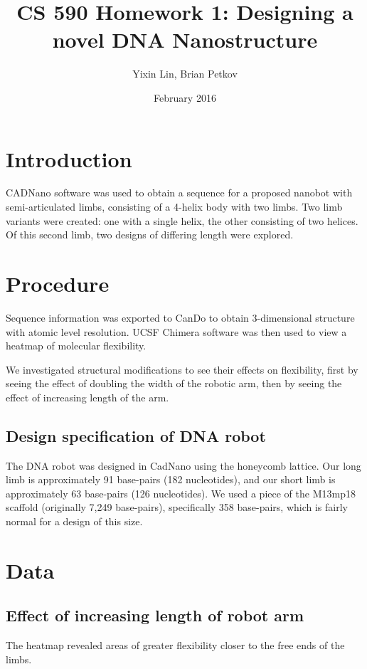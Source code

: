 \documentclass{article}
\title{CS 590 Homework 1: Designing a novel DNA Nanostructure}
\author{Yixin Lin, Brian Petkov }
\date{February 2016}
\begin{document}
\maketitle

\section{Introduction}

CADNano software was used to obtain a sequence for a proposed nanobot with semi-articulated limbs, consisting of a 4-helix body with two limbs. Two limb variants were created: one with a single helix, the other consisting of two helices. Of this second limb, two designs of differing length were explored.

\section{Procedure}

Sequence information was exported to CanDo to obtain 3-dimensional structure with atomic level resolution. UCSF Chimera software was then used to view a heatmap of molecular flexibility.

We investigated structural modifications to see their effects on flexibility, first by seeing the effect of doubling the width of the robotic arm, then by seeing the effect of increasing length of the arm.

\subsection{Design specification of DNA robot}

The DNA robot was designed in CadNano using the honeycomb lattice. Our long limb is approximately 91 base-pairs (182 nucleotides), and our short limb is approximately 63 base-pairs (126 nucleotides). We used a piece of the M13mp18 scaffold (originally 7,249 base-pairs), specifically 358 base-pairs, which is fairly normal for a design of this size.


\section{Data}


\subsection{Effect of increasing length of robot arm}
\textit{}
The heatmap revealed areas of greater flexibility closer to the free ends of the limbs.
\end{document}
